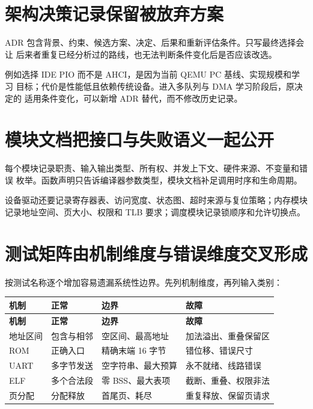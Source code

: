 \section{架构决策记录保留被放弃方案}

ADR 包含背景、约束、候选方案、决定、后果和重新评估条件。只写最终选择会让
后来者重复已经分析过的路线，也无法判断条件变化后是否应该改选。

例如选择 IDE PIO 而不是 AHCI，是因为当前 QEMU PC 基线、实现规模和学习
目标；代价是性能低且依赖传统设备。进入多队列与 DMA 学习阶段后，原决定的
适用条件变化，可以新增 ADR 替代，而不修改历史记录。

\section{模块文档把接口与失败语义一起公开}

每个模块记录职责、输入输出类型、所有权、并发上下文、硬件来源、不变量和错误
枚举。函数声明只告诉编译器参数类型，模块文档补足调用时序和生命周期。

设备驱动还要记录寄存器表、访问宽度、状态图、超时来源与复位策略；内存模块
记录地址空间、页大小、权限和 TLB 要求；调度模块记录锁顺序和允许切换点。

\section{测试矩阵由机制维度与错误维度交叉形成}

按测试名称逐个增加容易遗漏系统性边界。先列机制维度，再列输入类别：

\begin{longtable}{L{0.20\textwidth}L{0.21\textwidth}L{0.21\textwidth}L{0.26\textwidth}}
\toprule
\textbf{机制} & \textbf{正常} & \textbf{边界} & \textbf{故障}\\
\midrule
\endfirsthead
\toprule
\textbf{机制} & \textbf{正常} & \textbf{边界} & \textbf{故障}\\
\midrule
\endhead
地址区间 & 包含与相邻 & 空区间、最高地址 & 加法溢出、重叠保留区\\
ROM & 正确入口 & 精确末端 16 字节 & 错位移、错误尺寸\\
UART & 多字节发送 & 空字符串、最大预算 & 永不就绪、线路错误\\
ELF & 多个合法段 & 零 BSS、最大表项 & 截断、重叠、权限非法\\
页分配 & 分配释放 & 首尾页、耗尽 & 重复释放、保留页请求\\
\bottomrule
\end{longtable}


